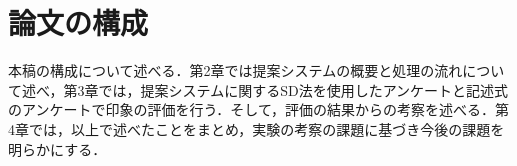 \section{論文の構成}

本稿の構成について述べる．第2章では提案システムの概要と処理の流れについて述べ，第3章では，提案システムに関するSD法を使用したアンケートと記述式のアンケートで印象の評価を行う．そして，評価の結果からの考察を述べる．第4章では，以上で述べたことをまとめ，実験の考察の課題に基づき今後の課題を明らかにする．

